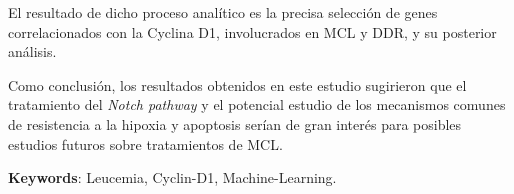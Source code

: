 El resultado de dicho proceso analítico es la precisa selección de genes correlacionados con la Cyclina D1, involucrados en MCL y DDR, y su posterior análisis.

Como conclusión, los resultados obtenidos en este estudio sugirieron que el tratamiento del \textit{Notch pathway} y el potencial estudio de los mecanismos comunes de resistencia a la hipoxia y apoptosis serían de gran interés para posibles estudios futuros sobre tratamientos de MCL.

\vspace{1.5cm}

\textbf{Keywords}: Leucemia, Cyclin-D1, Machine-Learning.

